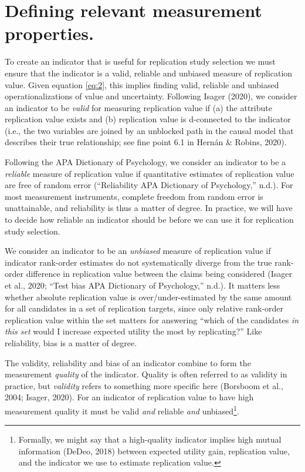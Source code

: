 \documentclass[
  english,
  man,floatsintext]{apa6}
\begin{document}
\hypertarget{defining-relevant-measurement-properties.}{%
\section{Defining relevant measurement properties.}\label{defining-relevant-measurement-properties.}}

To create an indicator that is useful for replication study selection we must ensure that the indicator is a valid, reliable and unbiased measure of replication value. Given equation \eqref{eq:2}, this implies finding valid, reliable and unbiased operationalizations of value and uncertainty. Following Isager (2020), we consider an indicator to be \emph{valid} for measuring replication value if (a) the attribute replication value exists and (b) replication value is d-connected to the indicator (i.e., the two variables are joined by an unblocked path in the causal model that describes their true relationship; see fine point 6.1 in Hernán \& Robins, 2020).

Following the APA Dictionary of Psychology, we consider an indicator to be a \emph{reliable} measure of replication value if quantitative estimates of replication value are free of random error ({``Reliability \textendash{} {APA Dictionary} of {Psychology},''} n.d.). For most measurement instruments, complete freedom from random error is unattainable, and reliability is thus a matter of degree. In practice, we will have to decide how reliable an indicator should be before we can use it for replication study selection.

We consider an indicator to be an \emph{unbiased} measure of replication value if indicator rank-order estimates do not systematically diverge from the true rank-order difference in replication value between the claims being considered (Isager et al., 2020; {``Test bias \textendash{} {APA Dictionary} of {Psychology},''} n.d.). It matters less whether absolute replication value is over/under-estimated by the same amount for all candidates in a set of replication targets, since only relative rank-order replication value within the set matters for answering ``which of the candidates \emph{in this set} would I increase expected utility the most by replicating?'' Like reliability, bias is a matter of degree.

The validity, reliability and bias of an indicator combine to form the measurement \emph{quality} of the indicator. Quality is often referred to as validity in practice, but \emph{validity} refers to something more specific here (Borsboom et al., 2004; Isager, 2020). For an indicator of replication value to have high measurement quality it must be valid \emph{and} reliable \emph{and} unbiased\footnote{Formally, we might say that a high-quality indicator implies high mutual information (DeDeo, 2018) between expected utility gain, replication value, and the indicator we use to estimate replication value.}.
\end{document}
